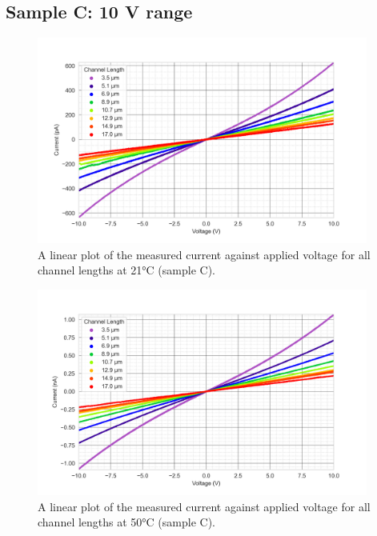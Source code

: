 \subsection{Sample C: 10 \si{\volt} range}
\label{app:I_V_sample_C}

\begin{figure}[h]
    \centering
    \includegraphics[width=0.97\textwidth]{Chapter3/Figs/Raster/Sample C 2019/IV/10V IV characteristics at 21 C.png}
    \caption{A linear plot of the measured current against applied voltage for all channel lengths at 21\si{\degreeCelsius} (sample C).}
    \label{appfig:C_current_voltage_21}
\end{figure}
\begin{figure}[h]
    \centering
    \includegraphics[width=0.97\textwidth]{Chapter3/Figs/Raster/Sample C 2019/IV/10V IV characteristics at 50 C.png}
    \caption{A linear plot of the measured current against applied voltage for all channel lengths at 50\si{\degreeCelsius} (sample C).}
    \label{appfig:C_current_voltage_50}
\end{figure}
